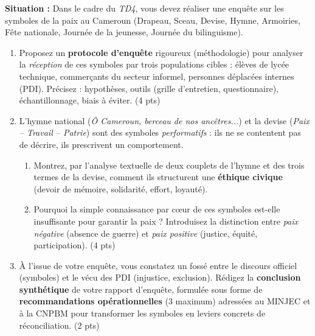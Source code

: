 \documentclass[11pt]{article}
\begin{document}
\begin{exercice}
\textbf{Situation :} Dans le cadre du \textit{TD4}, vous devez réaliser une enquête sur les symboles de la paix au Cameroun (Drapeau, Sceau, Devise, Hymne, Armoiries, Fête nationale, Journée de la jeunesse, Journée du bilinguisme).

\begin{enumerate}
    \item Proposez un \textbf{protocole d'enquête} rigoureux (méthodologie) pour analyser la \textit{réception} de ces symboles par trois populations cibles : élèves de lycée technique, commerçants du secteur informel, personnes déplacées internes (PDI). Précisez : hypothèses, outils (grille d'entretien, questionnaire), échantillonnage, biais à éviter. (4 pts)
    \item L'hymne national (\textit{Ô Cameroun, berceau de nos ancêtres...}) et la devise (\textit{Paix -- Travail -- Patrie}) sont des symboles \textit{performatifs} : ils ne se contentent pas de décrire, ils prescrivent un comportement. 
    \begin{enumerate}
        \item Montrez, par l'analyse textuelle de deux couplets de l'hymne et des trois termes de la devise, comment ils structurent une \textbf{éthique civique} (devoir de mémoire, solidarité, effort, loyauté). 
        \item Pourquoi la simple connaissance par cœur de ces symboles est-elle insuffisante pour garantir la paix ? Introduisez la distinction entre \textit{paix négative} (absence de guerre) et \textit{paix positive} (justice, équité, participation). (4 pts)
    \end{enumerate}
    \item À l'issue de votre enquête, vous constatez un fossé entre le discours officiel (symboles) et le vécu des PDI (injustice, exclusion). Rédigez la \textbf{conclusion synthétique} de votre rapport d'enquête, formulée sous forme de \textbf{recommandations opérationnelles} (3 maximum) adressées au MINJEC et à la CNPBM pour transformer les symboles en leviers concrets de réconciliation. (2 pts)
\end{enumerate}
\end{exercice}
\end{document}
